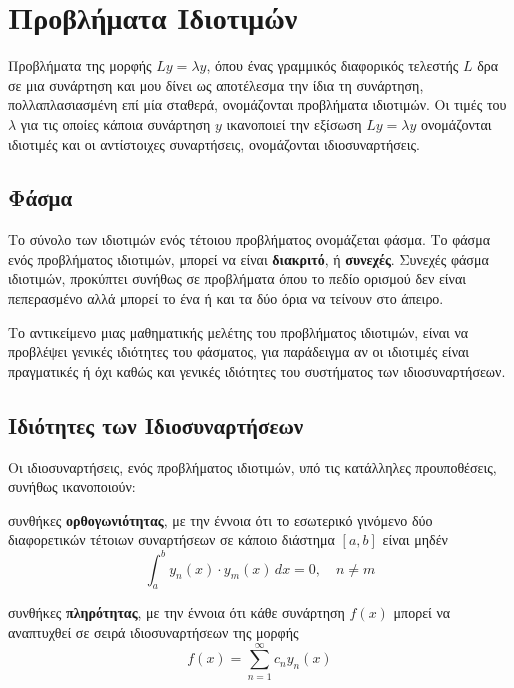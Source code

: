 \section*{Προβλήματα Ιδιοτιμών}

Προβλήματα της μορφής $ Ly= \lambda y $, όπου ένας γραμμικός διαφορικός τελεστής $L$ 
δρα σε μια συνάρτηση και μου δίνει ως αποτέλεσμα την ίδια τη συνάρτηση, πολλαπλασιασμένη 
επί μία σταθερά, ονομάζονται \textcolor{Col1}{προβλήματα ιδιοτιμών}.
Οι τιμές του $ \lambda $ για τις οποίες κάποια συνάρτηση $ y $ ικανοποιεί την εξίσωση 
$ Ly= \lambda y $ ονομάζονται \textcolor{Col1}{ιδιοτιμές} και οι αντίστοιχες 
συναρτήσεις, ονομάζονται \textcolor{Col1}{ιδιοσυναρτήσεις}.

\subsection*{Φάσμα}

Το σύνολο των ιδιοτιμών ενός τέτοιου προβλήματος ονομάζεται φάσμα. Το φάσμα ενός 
προβλήματος ιδιοτιμών, μπορεί να είναι \textbf{διακριτό}, ή \textbf{συνεχές}. Συνεχές 
φάσμα ιδιοτιμών, προκύπτει συνήθως σε προβλήματα όπου το πεδίο ορισμού 
δεν είναι πεπερασμένο αλλά μπορεί το ένα ή και τα δύο όρια να τείνουν στο άπειρο.

\begin{rem}
  Το αντικείμενο μιας μαθηματικής μελέτης του προβλήματος ιδιοτιμών, είναι να 
  προβλέψει γενικές ιδιότητες του φάσματος, για παράδειγμα αν οι ιδιοτιμές είναι 
  πραγματικές ή όχι καθώς και γενικές ιδιότητες του συστήματος των ιδιοσυναρτήσεων.
\end{rem}

\subsection*{Ιδιότητες των Ιδιοσυναρτήσεων}

Οι ιδιοσυναρτήσεις, ενός προβλήματος ιδιοτιμών, υπό τις κατάλληλες προυποθέσεις, συνήθως 
ικανοποιούν:
\begin{myitemize}
  \item συνθήκες \textbf{ορθογωνιότητας}, με την έννοια ότι το εσωτερικό γινόμενο 
    δύο διαφορετικών τέτοιων συναρτήσεων σε κάποιο διάστημα $[a,b]$ είναι μηδέν
    \[
      \int _{a}^{b}y_{n}(x)\cdot y_{m}(x) \,{dx} = 0, \quad n \neq m
    \] 
  \item συνθήκες \textbf{πληρότητας}, με την έννοια ότι κάθε συνάρτηση $ f(x) $ μπορεί να 
    αναπτυχθεί σε σειρά ιδιοσυναρτήσεων της μορφής
    \[
      f(x) = \sum_{n=1}^{\infty} c_{n} y_{n}(x) 
    \]
\end{myitemize}

